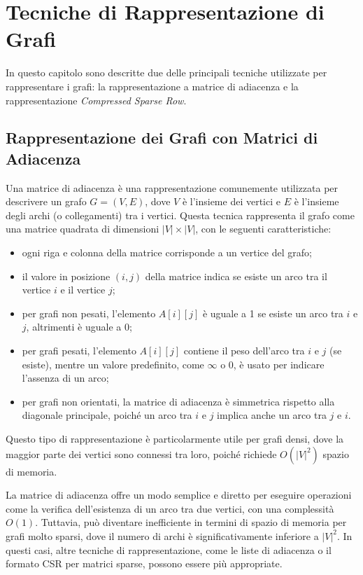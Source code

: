 \chapter{Tecniche di Rappresentazione di Grafi}\label{app:csr}

    In questo capitolo sono descritte due delle principali tecniche utilizzate per rappresentare i grafi: la rappresentazione a matrice di adiacenza e la rappresentazione \textit{Compressed Sparse Row}.

    \section{Rappresentazione dei Grafi con Matrici di Adiacenza}
        Una matrice di adiacenza è una rappresentazione comunemente utilizzata per descrivere un grafo $G = (V, E)$, dove $V$ è l'insieme dei vertici e $E$ è l'insieme degli archi (o collegamenti) tra i vertici. Questa tecnica rappresenta il grafo come una matrice quadrata di dimensioni $|V| \times |V|$, con le seguenti caratteristiche:

        \begin{itemize}
            \item ogni riga e colonna della matrice corrisponde a un vertice del grafo;
            \item il valore in posizione $(i, j)$ della matrice indica se esiste un arco tra il vertice $i$ e il vertice $j$;
            \item per grafi non pesati, l'elemento $A[i][j]$ è uguale a 1 se esiste un arco tra $i$ e $j$, altrimenti è uguale a 0;
            \item per grafi pesati, l'elemento $A[i][j]$ contiene il peso dell'arco tra $i$ e $j$ (se esiste), mentre un valore predefinito, come $\infty$ o 0, è usato per indicare l'assenza di un arco;
            \item per grafi non orientati, la matrice di adiacenza è simmetrica rispetto alla diagonale principale, poiché un arco tra $i$ e $j$ implica anche un arco tra $j$ e $i$.
        \end{itemize}
    
        Questo tipo di rappresentazione è particolarmente utile per grafi densi, dove la maggior parte dei vertici sono connessi tra loro, poiché richiede $O(|V|^2)$ spazio di memoria.
    
        La matrice di adiacenza offre un modo semplice e diretto per eseguire operazioni come la verifica dell'esistenza di un arco tra due vertici, con una complessità $O(1)$. Tuttavia, può diventare inefficiente in termini di spazio di memoria per grafi molto sparsi, dove il numero di archi è significativamente inferiore a $|V|^2$. In questi casi, altre tecniche di rappresentazione, come le liste di adiacenza o il formato CSR per matrici sparse, possono essere più appropriate.


